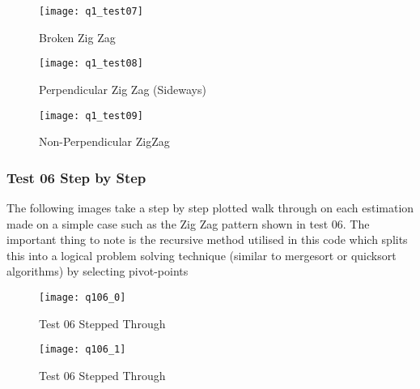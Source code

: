 			\begin{figure}[position = here]
				\begin{centering}
					\texttt{[image: q1\_test07]}\\
					\caption[\textit{RPYAxes}]{Broken Zig Zag}
				\end{centering}
			\end{figure}
			\newline			
			
			\begin{figure}[position = here]
				\begin{centering}
					\texttt{[image: q1\_test08]}\\
					\caption[\textit{RPYAxes}]{Perpendicular Zig Zag (Sideways)}
				\end{centering}
			\end{figure}
			\newline			
			
			\begin{figure}[position = here]
				\begin{centering}
					\texttt{[image: q1\_test09]}\\
					\caption[\textit{RPYAxes}]{Non-Perpendicular ZigZag}
				\end{centering}
			\end{figure}
			\newline			
			
			\pagebreak
		\subsubsection{Test 06 Step by Step}
		The following images take a step by step plotted walk through on each estimation made on a simple case such as the Zig Zag pattern shown in test 06. The important thing to note is the recursive method utilised in this code which splits this into a logical problem solving technique (similar to mergesort or quicksort algorithms) by selecting pivot-points 
			\begin{figure}[position = here]
				\begin{centering}
					\texttt{[image: q106\_0]}\\
					\caption[\textit{RPYAxes}]{Test 06 Stepped Through}
				\end{centering}
			\end{figure}
			\newline			
			
			\begin{figure}[position = here]
				\begin{centering}
					\texttt{[image: q106\_1]}\\
					\caption[\textit{RPYAxes}]{Test 06 Stepped Through}
				\end{centering}
			\end{figure}
			\newline						

